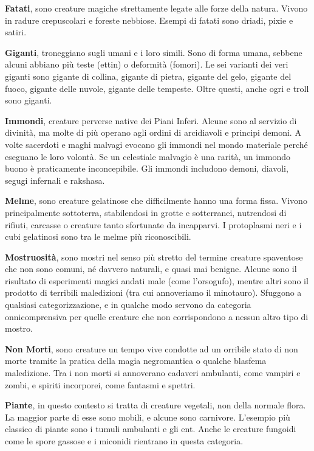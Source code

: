 \medskip\textbf{Fatati}, sono creature magiche strettamente legate alle forze della natura. Vivono in radure crepuscolari e foreste nebbiose. Esempi di fatati sono driadi, pixie e satiri.

\medskip\textbf{Giganti}, troneggiano sugli umani e i loro simili. Sono di forma umana, sebbene alcuni abbiano più teste (ettin) o deformità (fomori). Le sei varianti dei veri giganti sono gigante di collina, gigante di pietra, gigante del gelo, gigante del fuoco, gigante delle nuvole, gigante delle tempeste. Oltre questi, anche ogri e troll sono giganti. 

\medskip\textbf{Immondi}, creature perverse native dei Piani Inferi. Alcune sono al servizio di  divinità, ma molte di più operano agli ordini di arcidiavoli e principi demoni. A volte sacerdoti e maghi malvagi evocano gli immondi nel mondo materiale perché eseguano le loro volontà. Se un celestiale malvagio è una rarità, un immondo buono è praticamente inconcepibile. Gli immondi includono demoni, diavoli, segugi infernali e rakshasa. 

\medskip\textbf{Melme}, sono creature gelatinose che difficilmente hanno una forma fissa. Vivono principalmente sottoterra, stabilendosi in grotte e sotterranei, nutrendosi di rifiuti, carcasse o creature tanto sfortunate da incapparvi. I protoplasmi neri e i cubi gelatinosi sono tra le melme più riconoscibili.

\medskip\textbf{Mostruosità}, sono mostri nel senso più stretto del termine creature spaventose che non sono comuni, né davvero naturali, e quasi mai benigne. Alcune sono il risultato di esperimenti magici andati male (come l'orsogufo), mentre altri sono il prodotto di terribili maledizioni (tra cui annoveriamo il minotauro). Sfuggono a qualsiasi categorizzazione, e in qualche modo servono da categoria onnicomprensiva per quelle creature che non corrispondono a nessun altro tipo di mostro. 

\medskip\textbf{Non Morti}, sono creature un tempo vive condotte ad un orribile stato di non morte tramite la pratica della magia negromantica o qualche blasfema maledizione. Tra i non morti si annoverano cadaveri ambulanti, come vampiri e zombi, e spiriti incorporei, come fantasmi e spettri.

\medskip\textbf{Piante}, in questo contesto si tratta di creature vegetali, non della normale flora. La maggior parte di esse sono mobili, e alcune sono carnivore. L'esempio più classico di piante sono i tumuli ambulanti e gli ent. Anche le creature fungoidi come le spore gassose e i miconidi rientrano in questa categoria.

